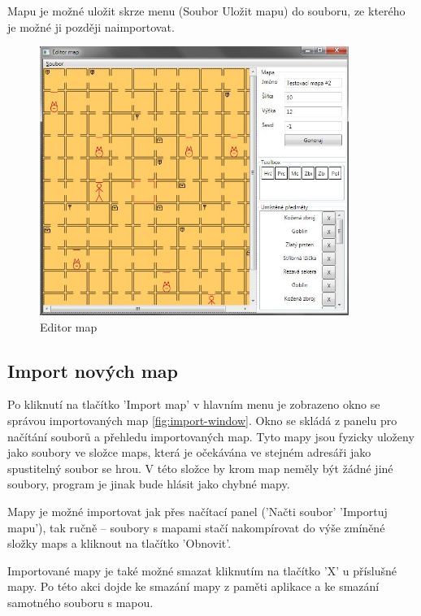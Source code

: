 \documentclass[11pt,a4paper]{scrartcl}
\begin{document}
	Mapu je možné uložit skrze menu (Soubor \textrightarrow Uložit mapu) do souboru, ze kterého je možné ji později naimportovat.
	
	\begin{figure}[H]
		\centering
		\includegraphics[width=380px]{editor-window}
		\caption{Editor map}
		\label{fig:editor-window}
	\end{figure}
	
	\subsection{Import nových map}
	Po kliknutí na tlačítko 'Import map' v hlavním menu je zobrazeno okno se správou importovaných map \ref{fig:import-window}. Okno se skládá z panelu pro načítání souborů a přehledu importovaných map. Tyto mapy jsou fyzicky uloženy jako soubory ve složce maps, která je očekávána ve stejném adresáři jako spustitelný soubor se hrou. V této složce by krom map neměly být žádné jiné soubory, program je jinak bude hlásit jako chybné mapy.
	
	Mapy je možné importovat jak přes načítací panel ('Načti soubor' \textrightarrow 'Importuj mapu'), tak ručně -- soubory s mapami stačí nakompírovat do výše zmíněné složky maps a kliknout na tlačítko 'Obnovit'. 
	
	Importované mapy je také možné smazat kliknutím na tlačítko 'X' u příslušné mapy. Po této akci dojde ke smazání mapy z paměti aplikace a ke smazání samotného souboru s mapou.
	
\end{document}
